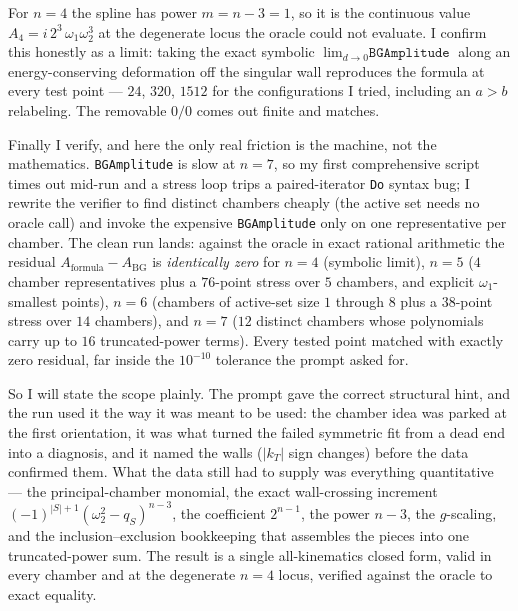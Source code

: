 \documentclass{article}
\begin{document}
For $n=4$ the spline has power $m=n-3=1$, so it is the continuous value
$A_4=i\,2^3\,\omega_1\omega_2^3$ at the degenerate locus the oracle could not
evaluate. I confirm this honestly as a limit: taking the exact symbolic
$\lim_{d\to0}\texttt{BGAmplitude}$ along an energy-conserving deformation off the
singular wall reproduces the formula at every test point --- $24$, $320$, $1512$
for the configurations I tried, including an $a>b$ relabeling. The removable
$0/0$ comes out finite and matches.

Finally I verify, and here the only real friction is the machine, not the
mathematics. \texttt{BGAmplitude} is slow at $n=7$, so my first comprehensive
script times out mid-run and a stress loop trips a paired-iterator
\texttt{Do} syntax bug; I rewrite the verifier to find distinct chambers cheaply
(the active set needs no oracle call) and invoke the expensive
\texttt{BGAmplitude} only on one representative per chamber. The clean run lands:
against the oracle in exact rational arithmetic the residual
$A_{\text{formula}}-A_{\text{BG}}$ is \emph{identically zero} for $n=4$ (symbolic
limit), $n=5$ ($4$ chamber representatives plus a $76$-point stress over $5$
chambers, and explicit $\omega_1$-smallest points), $n=6$ (chambers of active-set
size $1$ through $8$ plus a $38$-point stress over $14$ chambers), and $n=7$ ($12$
distinct chambers whose polynomials carry up to $16$ truncated-power terms). Every
tested point matched with exactly zero residual, far inside the $10^{-10}$
tolerance the prompt asked for.

So I will state the scope plainly. The prompt gave the correct structural hint,
and the run used it the way it was meant to be used: the chamber idea was parked
at the first orientation, it was what turned the failed symmetric fit from a dead
end into a diagnosis, and it named the walls ($|k_T|$ sign changes) before the
data confirmed them. What the data still had to supply was everything
quantitative --- the principal-chamber monomial, the exact wall-crossing increment
$(-1)^{|S|+1}(\omega_2^2-q_S)^{n-3}$, the coefficient $2^{n-1}$, the power $n-3$,
the $g$-scaling, and the inclusion--exclusion bookkeeping that assembles the
pieces into one truncated-power sum. The result is a single all-kinematics closed
form, valid in every chamber and at the degenerate $n=4$ locus, verified against
the oracle to exact equality.
\end{document}
